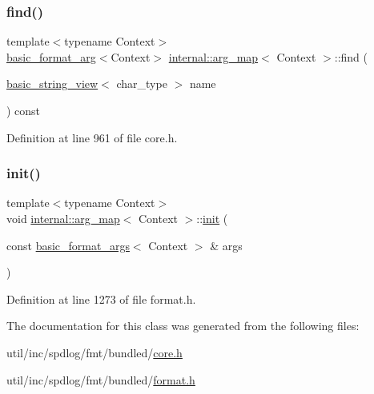 \subsubsection{\texorpdfstring{find()}{find()}}
{\footnotesize\ttfamily template$<$typename Context$>$ \\
\hyperlink{classbasic__format__arg}{basic\+\_\+format\+\_\+arg}$<$Context$>$ \hyperlink{classinternal_1_1arg__map}{internal\+::arg\+\_\+map}$<$ Context $>$\+::find (\begin{DoxyParamCaption}\item[{\hyperlink{classbasic__string__view}{basic\+\_\+string\+\_\+view}$<$ char\+\_\+type $>$}]{name }\end{DoxyParamCaption}) const\hspace{0.3cm}{\ttfamily [inline]}}



Definition at line 961 of file core.\+h.

\mbox{\label{classinternal_1_1arg__map_a8c9b335dab49cad2ea460e7294e19e41}} 
\subsubsection{\texorpdfstring{init()}{init()}}
{\footnotesize\ttfamily template$<$typename Context$>$ \\
void \hyperlink{classinternal_1_1arg__map}{internal\+::arg\+\_\+map}$<$ Context $>$\+::\hyperlink{structinternal_1_1init}{init} (\begin{DoxyParamCaption}\item[{const \hyperlink{classbasic__format__args}{basic\+\_\+format\+\_\+args}$<$ Context $>$ \&}]{args }\end{DoxyParamCaption})}



Definition at line 1273 of file format.\+h.



The documentation for this class was generated from the following files\+:\begin{DoxyCompactItemize}
\item 
util/inc/spdlog/fmt/bundled/\hyperlink{core_8h}{core.\+h}\item 
util/inc/spdlog/fmt/bundled/\hyperlink{format_8h}{format.\+h}\end{DoxyCompactItemize}
